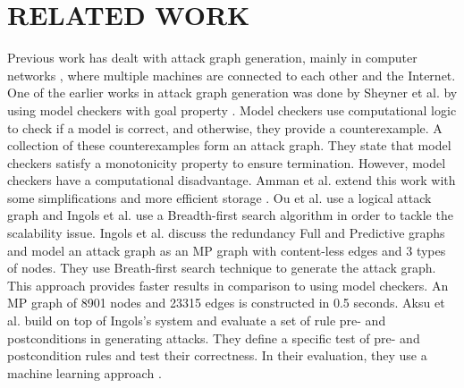 \section{RELATED WORK}
\label{chap:related_work}

Previous work has dealt with attack graph generation, mainly in computer networks \cite{ingols2006practical, sheyner2002automated, ritchey2000using, ou2006scalable}, where multiple machines are connected to each other and the Internet. %
One of the earlier works in attack graph generation was done by Sheyner et al. by using model checkers with goal property \cite{sheyner2002automated}. Model checkers use computational logic to check if a model is correct, and otherwise, they provide a counterexample. A collection of these counterexamples form an attack graph. They state that model checkers satisfy a monotonicity property  to ensure termination. However, model checkers have a computational disadvantage. %
 Amman et al. extend this work with some simplifications and more efficient storage \cite{ritchey2000using}. Ou et al. use a logical attack graph \cite{ou2006scalable} and Ingols \cite{ingols2006practical} et al. use a Breadth-first search algorithm in order to tackle the scalability issue. Ingols et al. discuss the redundancy Full and Predictive graphs and model an attack graph as an MP graph with content-less edges and 3 types of nodes. They use Breath-first search technique to generate the attack graph. This approach provides faster results in comparison to using model checkers. An MP graph of 8901 nodes and 23315 edges is constructed in 0.5 seconds. Aksu et al. build on top of Ingols's system and evaluate a set of rule pre- and postconditions in generating attacks. They define a specific test of pre- and postcondition rules and test their correctness. In their evaluation, they use a machine learning approach \cite{aksu2018automated}.

